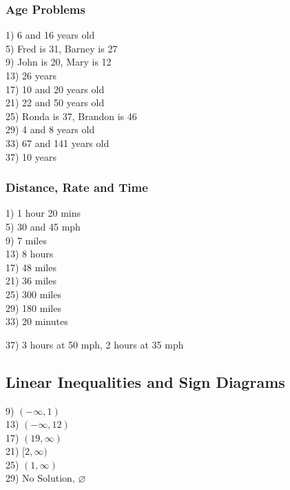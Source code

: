 \documentclass[11pt]{book}
\begin{document}
\subsubsection*{Age Problems}

\begin{multicols}{2}
1) 6 and 16 years old\\
5) Fred is 31, Barney is 27\\
9) John is 20, Mary is 12\\
13) 26 years\\
17) 10 and 20 years old\\
21) 22 and 50 years old\\
25) Ronda is 37, Brandon is 46\\
29) 4 and 8 years old\\
33) 67 and 141 years old\\
37) 10 years
\end{multicols}

\subsubsection{Distance, Rate and Time}

\begin{multicols}{2}
1) 1 hour 20 mins\\
5) 30 and 45 mph\\
9) 7 miles\\
13) 8 hours\\
17) 48 miles\\
21) 36 miles\\
25) 300 miles\\
29) 180 miles\\
33) 20 minutes
\end{multicols}
37) 3 hours at 50 mph, 2 hours at 35 mph

\newpage

\subsection*{Linear Inequalities and Sign Diagrams}

\begin{multicols}{2}
9) $(-\infty,1)$\\
13) $(-\infty,12)$\\
17) $(19,\infty)$\\
21) $[2,\infty)$\\
25) $(1,\infty)$\\
29) No Solution, $\varnothing$
\end{multicols}
\end{document}
